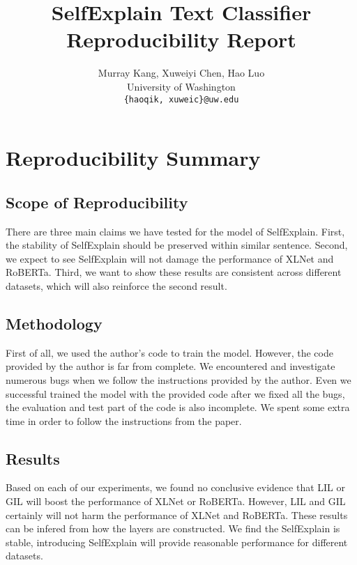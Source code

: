 \documentclass{article}
\title{SelfExplain Text Classifier Reproducibility Report}
\author{%
  Murray Kang,  Xuweiyi Chen,  Hao Luo \\ %
  University of Washington \\
 \texttt{\{haoqik, xuweic\}@uw.edu} \\ %
}
\begin{document}
\maketitle



\section*{\centering Reproducibility Summary}


\subsection*{Scope of Reproducibility}

There are three main claims we have tested for the model of SelfExplain. First, the stability 
of SelfExplain should be preserved within similar sentence. Second, we expect to see SelfExplain 
will not damage the performance of XLNet and RoBERTa. Third, we want to show these results are consistent across
 different datasets, which will also reinforce the second result.

\subsection*{Methodology}

First of all, we used the author's code to train the model. However, the code provided by 
the author is far from complete. We encountered and investigate numerous bugs when we follow
the instructions provided by the author. Even we successful trained the model with the provided 
code after we fixed all the bugs, the evaluation and test part of the code is also incomplete. 
We spent some extra time in order to follow the instructions from the paper.

\subsection*{Results}

Based on each of our experiments, we found no conclusive evidence 
that LIL or GIL will boost the performance of XLNet or RoBERTa. However, LIL and GIL certainly 
will not harm the performance of XLNet and RoBERTa. These results can be infered from how 
the layers are constructed. We find the SelfExplain is stable, introducing SelfExplain will provide reasonable 
performance for different datasets.
\end{document}
